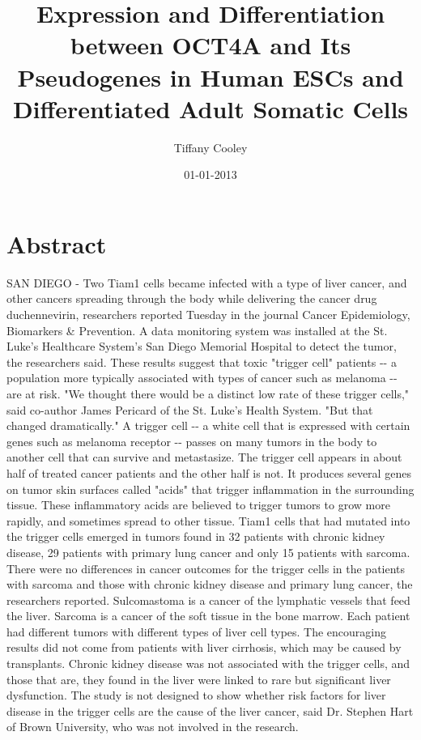 \documentclass{article}%
\title{Expression and Differentiation between OCT4A and Its Pseudogenes in Human ESCs and Differentiated Adult Somatic Cells}%
\author{Tiffany Cooley}%
\affil{Institute of Bioinformatics and Biosignal Transduction, College of Bioscience and Biotechnology, National Cheng{-}Kung University, Tainan, Taiwan}%
\date{01{-}01{-}2013}%
\begin{document}
%
\normalsize%
\maketitle%
\section{Abstract}%
\label{sec:Abstract}%
SAN DIEGO {-} Two Tiam1 cells became infected with a type of liver cancer, and other cancers spreading through the body while delivering the cancer drug duchennevirin, researchers reported Tuesday in the journal Cancer Epidemiology, Biomarkers \& Prevention.\newline%
A data monitoring system was installed at the St. Luke's Healthcare System's San Diego Memorial Hospital to detect the tumor, the researchers said.\newline%
These results suggest that toxic "trigger cell" patients {-}{-} a population more typically associated with types of cancer such as melanoma {-}{-} are at risk.\newline%
"We thought there would be a distinct low rate of these trigger cells," said co{-}author James Pericard of the St. Luke's Health System. "But that changed dramatically."\newline%
A trigger cell {-}{-} a white cell that is expressed with certain genes such as melanoma receptor {-}{-} passes on many tumors in the body to another cell that can survive and metastasize. The trigger cell appears in about half of treated cancer patients and the other half is not.\newline%
It produces several genes on tumor skin surfaces called "acids" that trigger inflammation in the surrounding tissue. These inflammatory acids are believed to trigger tumors to grow more rapidly, and sometimes spread to other tissue.\newline%
Tiam1 cells that had mutated into the trigger cells emerged in tumors found in 32 patients with chronic kidney disease, 29 patients with primary lung cancer and only 15 patients with sarcoma.\newline%
There were no differences in cancer outcomes for the trigger cells in the patients with sarcoma and those with chronic kidney disease and primary lung cancer, the researchers reported.\newline%
Sulcomastoma is a cancer of the lymphatic vessels that feed the liver. Sarcoma is a cancer of the soft tissue in the bone marrow.\newline%
Each patient had different tumors with different types of liver cell types. The encouraging results did not come from patients with liver cirrhosis, which may be caused by transplants.\newline%
Chronic kidney disease was not associated with the trigger cells, and those that are, they found in the liver were linked to rare but significant liver dysfunction.\newline%
The study is not designed to show whether risk factors for liver disease in the trigger cells are the cause of the liver cancer, said Dr. Stephen Hart of Brown University, who was not involved in the research.
\end{document}
